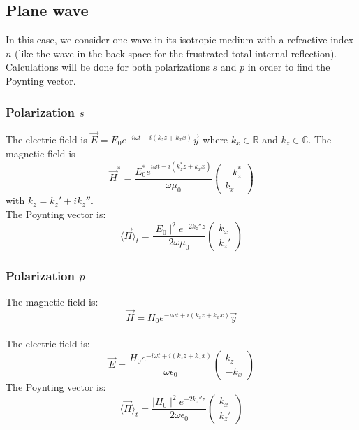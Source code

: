 \subsection{Plane wave}
In this case, we consider one wave in its isotropic medium with a refractive index $n$ (like the wave in the back space for the frustrated total internal reflection). Calculations will be done for both polarizations $s$ and $p$ in order to find the Poynting vector.\\

\subsubsection{Polarization $s$}
The electric field is $\vec{E}=E_0e^{-i\omega t+i(k_zz+k_xx)}\vec{y}$ where $k_x\in \mathbb{R}$ and $k_z\in \mathbb{C}$.
The magnetic field is\\
\begin{equation*}
\vec{H}^*=\frac{E_0^*e^{i\omega t-i(k_z^*z+k_xx)}}{\omega \mu _0}
\begin{pmatrix}
-k_z^*\\
k_x
\end{pmatrix}
\end{equation*}
 with $k_z=k_z'+ik_z''$.\\
The Poynting vector is:
\begin{equation}
\langle \vec{\Pi} \rangle _t=\displaystyle\frac{\displaystyle\mid E_0\mid ^2e^{-2k_z''z}}{\displaystyle2\omega \mu _0}
\begin{pmatrix}
k_x\\
k_z'
\end{pmatrix}
\end{equation}

\subsubsection{Polarization $p$}
The magnetic field is:\\
$$\vec{H}=H_0e^{-i\omega t+i(k_zz+k_xx)}\vec{y}$$\\
The electric field is:
\begin{equation*}
\vec{E}=\frac{H_0e^{-i\omega t+i(k_zz+k_xx)}}{\omega\epsilon_0}
\begin{pmatrix}
k_z\\
-k_x
\end{pmatrix}
\end{equation*}
The Poynting vector is:
\begin{equation}
\langle \vec{\Pi} \rangle _t=\displaystyle\frac{\displaystyle\mid H_0\mid ^2e^{-2k_z''z}}{\displaystyle2\omega \epsilon _0}
\begin{pmatrix}
k_x\\
k_z'
\end{pmatrix}
\end{equation}

